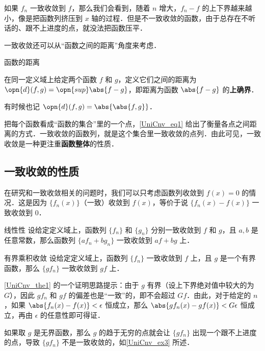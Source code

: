 如果 $f_n$ 一致收敛到 $f$，那么我们会看到，随着 $n$ 增大，$f_n-f$ 的上下界越来越小，像是把函数列挤压到 $x$ 轴的过程．但是不一致收敛的函数，由于总存在不听话的、跟不上进度的点，就没法把函数压平．

一致收敛还可以从“函数之间的距离”角度来考虑．

\begin{definition}{函数的距离}\label{UniCnv_def1}

在同一定义域上给定两个函数 $f$ 和 $g$，定义它们之间的距离为 $\opn{d}(f, g)=\opn{sup}\abs{f-g}$，即距离为函数 $\abs{f-g}$ 的\textbf{上确界}．

有时候也记 $\opn{d}(f, g)=\abs{\abs{f, g}}$．

\end{definition}

把每个函数看成“函数的集合”里的一个点，\autoref{UniCnv_eq1} 给出了衡量各点之间距离的方式．一致收敛的函数列，就是这个集合里一致收敛的点列．由此可见，一致收敛是一种更注重\textbf{函数整体}的性质．


\subsection{一致收敛的性质}

在研究和一致收敛相关的问题时，我们可以只考虑函数列收敛到 $f(x)=0$ 的情况．这是因为 $\{f_n(x)\}$（一致）收敛到 $f(x)$，等价于说 $\{f_n(x)-f(x)\}$ 一致收敛到 $0$．

\begin{theorem}{线性性}
设给定定义域上，函数列 $\{f_n\}$ 和 $\{g_n\}$ 分别一致收敛到 $f$ 和 $g$，且 $a, b$ 是任意常数，那么函数列 $\{af_n+bg_n\}$ 一致收敛到 $af+bg$ 上．
\end{theorem}

\begin{theorem}{有界乘积收敛}\label{UniCnv_the1}
设给定定义域上，函数列 $\{f_n\}$ 一致收敛到 $f$ 上，且 $g$ 是一个有界函数，那么 $\{gf_n\}$ 一致收敛到 $gf$ 上．
\end{theorem}

\autoref{UniCnv_the1} 的一个证明思路提示：由于 $g$ 有界（设上下界绝对值中较大的为 $G$），因此 $gf_n$ 和 $gf$ 的偏差也是“一致”的，即不会超过 $Gf$．由此，对于给定的 $n$，如果 $\abs{f_n(x)-f(x)}<\epsilon$ 恒成立，那么 $\abs{gf_n(x)-gf(x)}<G\epsilon$ 恒成立，再由 $\epsilon$ 的任意性即可得证．

如果取 $g$ 是无界函数，那么 $g$ 的趋于无穷的点就会让 $\{gf_n\}$ 出现一个跟不上进度的点，导致 $\{gf_n\}$ 不是一致收敛的，如\autoref{UniCnv_ex3} 所述．

